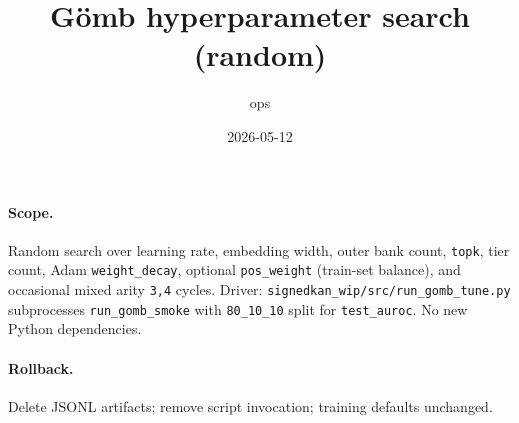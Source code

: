 \documentclass{article}
\title{G\"omb hyperparameter search (random)}
\author{ops}
\date{2026-05-12}
\begin{document}
\maketitle
\paragraph{Scope.}
Random search over learning rate, embedding width, outer bank count,
\texttt{topk}, tier count, Adam \texttt{weight\_decay}, optional
\texttt{pos\_weight} (train-set balance), and occasional mixed arity
\texttt{3,4} cycles.  Driver: \texttt{signedkan\_wip/src/run\_gomb\_tune.py}
subprocesses \texttt{run\_gomb\_smoke} with \texttt{80\_10\_10} split for
\texttt{test\_auroc}.  No new Python dependencies.

\paragraph{Rollback.}
Delete JSONL artifacts; remove script invocation; training defaults unchanged.
\end{document}
